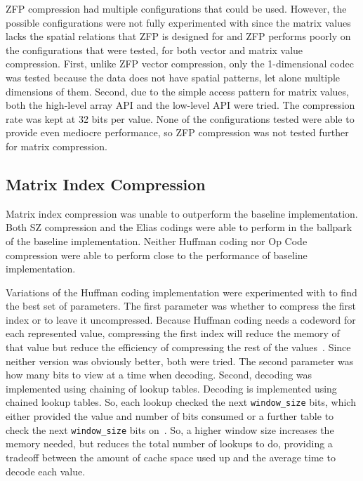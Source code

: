 ZFP compression had multiple configurations that could be used.
However, the possible configurations were not fully experimented with since the matrix values lacks the spatial relations that ZFP is designed for and ZFP performs poorly on the configurations that were tested, for both vector and matrix value compression.
First, unlike ZFP vector compression, only the 1-dimensional codec was tested because the data does not have spatial patterns, let alone multiple dimensions of them.
Second, due to the simple access pattern for matrix values, both the high-level array API and the low-level API were tried.
The compression rate was kept at 32 bits per value.
None of the configurations tested were able to provide even mediocre performance, so ZFP compression was not tested further for matrix compression.

\subsection{Matrix Index Compression}
\label{sec:results-inds}
Matrix index compression was unable to outperform the baseline implementation.
Both SZ compression and the Elias codings were able to perform in the ballpark of the baseline implementation.
Neither Huffman coding nor Op Code compression were able to perform close to the performance of baseline implementation.

Variations of the Huffman coding implementation were experimented with to find the best set of parameters.
The first parameter was whether to compress the first index or to leave it uncompressed.
Because Huffman coding needs a codeword for each represented value, compressing the first index will reduce the memory of that value but reduce the efficiency of compressing the rest of the values~\cite{Huffman:1952:coding}.
Since neither version was obviously better, both were tried.
The second parameter was how many bits to view at a time when decoding.
Second, decoding was implemented using chaining of lookup tables.
Decoding is implemented using chained lookup tables.
So, each lookup checked the next \texttt{window\_size} bits, which either provided the value and number of bits consumed or a further table to check the next \texttt{window\_size} bits on~\cite{Schindler:1998:huffman-decode}.
So, a higher window size increases the memory needed, but reduces the total number of lookups to do, providing a tradeoff between the amount of cache space used up and the average time to decode each value.

